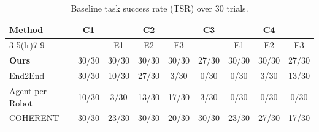 \begin{table}[t]
  \centering
  \caption{Baseline task success rate (TSR) over 30 trials.}
  \label{tab:baseline_tsr}
  \setlength{\tabcolsep}{2.0pt}
  \renewcommand{\arraystretch}{1.00}
  \scriptsize
  \begin{tabular*}{\columnwidth}{@{\extracolsep{\fill}}lcccccccc@{}}
    \toprule
    \multirow{2}{*}{\textbf{Method}} &
    \multirow{2}{*}{\textbf{C1}} &
    \multicolumn{3}{c}{\textbf{C2}} &
    \multirow{2}{*}{\textbf{C3}} &
    \multicolumn{3}{c}{\textbf{C4}} \\
    \cmidrule(lr){3-5}\cmidrule(lr){7-9}
    & & E1 & E2 & E3 & & E1 & E2 & E3 \\
    \midrule
    \textbf{Ours}
      & 30/30 & 30/30 & 30/30 & 30/30 & 27/30 & 30/30 & 30/30 & 27/30 \\
    End2End
      & 30/30 & 10/30 & 27/30 & 3/30 & 0/30 & 0/30 & 3/30 & 13/30 \\
    Agent per Robot
      & 10/30 & 3/30 & 13/30 & 17/30 & 3/30 & 0/30 & 0/30 & 0/30 \\
    COHERENT
      & 30/30 & 23/30 & 30/30 & 20/30 & 30/30 & 23/30 & 27/30 & 17/30 \\
    \bottomrule
  \end{tabular*}
\end{table}
